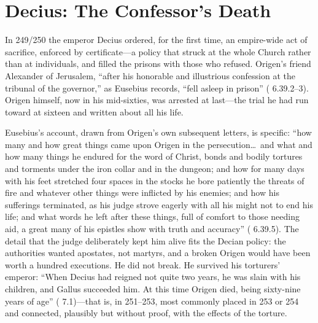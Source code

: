 \section{Decius: The Confessor's Death}

In 249/250 the emperor Decius ordered, for the first time, an empire-wide
act of sacrifice, enforced by certificate---a policy that struck at the
whole Church rather than at individuals, and filled the prisons with those
who refused. Origen's friend Alexander of Jerusalem, ``after his honorable
and illustrious confession at the tribunal of the governor,'' as Eusebius
records, ``fell asleep in prison'' ( 6.39.2--3). Origen himself, now in his
mid-sixties, was arrested at last---the trial he had run toward at sixteen
and written about all his life.

Eusebius's account, drawn from Origen's own subsequent letters, is specific:
``how many and how great things came upon Origen in the persecution\ldots\
and what and how many things he endured for the word of Christ, bonds and
bodily tortures and torments under the iron collar and in the dungeon; and
how for many days with his feet stretched four spaces in the stocks he bore
patiently the threats of fire and whatever other things were inflicted by
his enemies; and how his sufferings terminated, as his judge strove eagerly
with all his might not to end his life; and what words he left after these
things, full of comfort to those needing aid, a great many of his epistles
show with truth and accuracy'' (\work{Church History} 6.39.5). The detail
that the judge deliberately kept him alive fits the Decian policy: the
authorities wanted apostates, not martyrs, and a broken Origen would have
been worth a hundred executions. He did not break. He survived his torturers'
emperor: ``When Decius had reigned not quite two years, he was slain with
his children, and Gallus succeeded him. At this time Origen died, being
sixty-nine years of age'' (\work{Church History} 7.1)---that is, in
251--253, most commonly placed in 253 or 254 and connected, plausibly but
without proof, with the effects of the torture.

